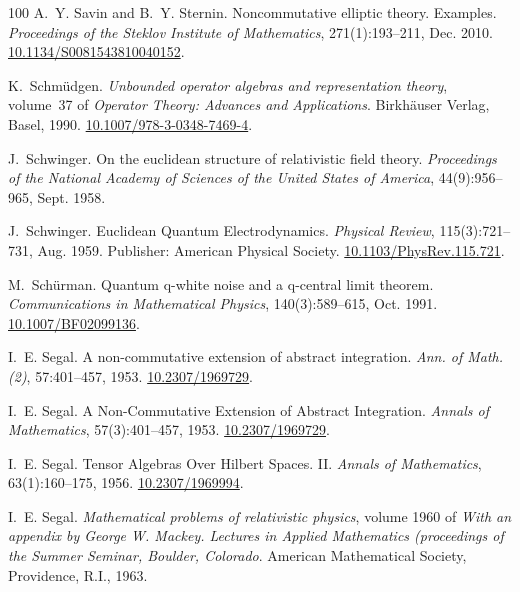 \documentclass[11pt]{article}
\newcommand{\tmtextit}[1]{{\itshape{#1}}}
\begin{document}
\begin{thebibliography}{100}
  A.~Y. Savin and B.~Y. Sternin.
  {\newblock}Noncommutative elliptic theory. Examples.
  {\newblock}\tmtextit{Proceedings of the Steklov Institute of Mathematics},
  271(1):193--211, Dec. 2010. {\newblock}
  \href{https://doi.org/10.1134/S0081543810040152}{10.1134/S0081543810040152}.
  
  K.~Schm{\"u}dgen.
  {\newblock}\tmtextit{Unbounded operator algebras and representation theory},
  volume~37 of \tmtextit{Operator Theory: Advances and Applications}.
  {\newblock}Birkh{\"a}user Verlag, Basel, 1990. {\newblock}
  \href{https://doi.org/10.1007/978-3-0348-7469-4}{10.1007/978-3-0348-7469-4}.
  
  J.~Schwinger. {\newblock}On the
  euclidean structure of relativistic field theory.
  {\newblock}\tmtextit{Proceedings of the National Academy of Sciences of the
  United States of America}, 44(9):956--965, Sept. 1958.
  
  J.~Schwinger. {\newblock}Euclidean
  Quantum Electrodynamics. {\newblock}\tmtextit{Physical Review},
  115(3):721--731, Aug. 1959. {\newblock}Publisher: American Physical Society.
  \href{https://doi.org/10.1103/PhysRev.115.721}{10.1103/PhysRev.115.721}.
  
  M.~Sch{\"u}rman. {\newblock}Quantum
  q-white noise and a q-central limit theorem.
  {\newblock}\tmtextit{Communications in Mathematical Physics},
  140(3):589--615, Oct. 1991.
  {\newblock}\href{https://doi.org/10.1007/BF02099136}{10.1007/BF02099136}.
  
  I.~E. Segal. {\newblock}A non-commutative extension of
  abstract integration. {\newblock}\tmtextit{Ann. of Math. (2)}, 57:401--457,
  1953. {\newblock}\href{https://doi.org/10.2307/1969729}{10.2307/1969729}.
  
  I.~E. Segal. {\newblock}A
  Non-Commutative Extension of Abstract Integration.
  {\newblock}\tmtextit{Annals of Mathematics}, 57(3):401--457, 1953.
  {\newblock}\href{https://doi.org/10.2307/1969729}{10.2307/1969729}.
  
  I.~E. Segal. {\newblock}Tensor Algebras Over
  Hilbert Spaces. II. {\newblock}\tmtextit{Annals of Mathematics},
  63(1):160--175, 1956.
  {\newblock}\href{https://doi.org/10.2307/1969994}{10.2307/1969994}.
  
  I.~E. Segal. {\newblock}\tmtextit{Mathematical
  problems of relativistic physics}, volume 1960 of \tmtextit{With an appendix
  by George W. Mackey. Lectures in Applied Mathematics (proceedings of the
  Summer Seminar, Boulder, Colorado}. {\newblock}American Mathematical
  Society, Providence, R.I., 1963.
  

\end{thebibliography}
\end{document}
